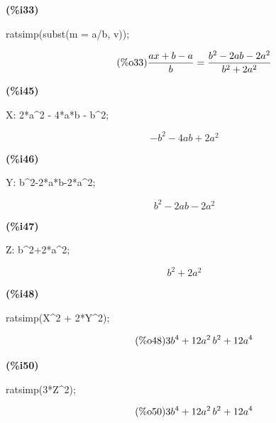 \documentclass[11pt]{amsart}
\begin{document}
\noindent
\begin{minipage}[t]{8ex}\color{red}\bf
(\%{}i33) 
\end{minipage}
\begin{minipage}[t]{\textwidth}\color{blue}
ratsimp(subst(m = a/b, v));
\end{minipage}
\[\displaystyle
\tag{\%{}o33}\label{o33} 
\frac{ax+b-a}{b}=\frac{{{b}^{2}}-2ab-2{{a}^{2}}}{{{b}^{2}}+2{{a}^{2}}}\mbox{}
\]


\noindent
\begin{minipage}[t]{8ex}\color{red}\bf
(\%{}i45) 
\end{minipage}
\begin{minipage}[t]{\textwidth}\color{blue}
X: 2*a\^{}2 - 4*a*b - b\^{}2;
\end{minipage}
\[\displaystyle
\tag{X}\label{X}
-{{b}^{2}}-4ab+2{{a}^{2}}\mbox{}
\]


\noindent
\begin{minipage}[t]{8ex}\color{red}\bf
(\%{}i46) 
\end{minipage}
\begin{minipage}[t]{\textwidth}\color{blue}
Y: b\^{}2-2*a*b-2*a\^{}2;
\end{minipage}
\[\displaystyle
\tag{Y}\label{Y}
{{b}^{2}}-2ab-2{{a}^{2}}\mbox{}
\]


\noindent
\begin{minipage}[t]{8ex}\color{red}\bf
(\%{}i47) 
\end{minipage}
\begin{minipage}[t]{\textwidth}\color{blue}
Z: b\^{}2+2*a\^{}2;
\end{minipage}
\[\displaystyle
\tag{Z}\label{Z}
{{b}^{2}}+2{{a}^{2}}\mbox{}
\]


\noindent
\begin{minipage}[t]{8ex}\color{red}\bf
(\%{}i48) 
\end{minipage}
\begin{minipage}[t]{\textwidth}\color{blue}
ratsimp(X\^{}2 + 2*Y\^{}2);
\end{minipage}
\[\displaystyle
\tag{\%{}o48}\label{o48} 
3{{b}^{4}}+12{{a}^{2}}\,{{b}^{2}}+12{{a}^{4}}\mbox{}
\]


\noindent
\begin{minipage}[t]{8ex}\color{red}\bf
(\%{}i50) 
\end{minipage}
\begin{minipage}[t]{\textwidth}\color{blue}
ratsimp(3*Z\^{}2);
\end{minipage}
\[\displaystyle
\tag{\%{}o50}\label{o50} 
3{{b}^{4}}+12{{a}^{2}}\,{{b}^{2}}+12{{a}^{4}}\mbox{}
\]
\end{document}
